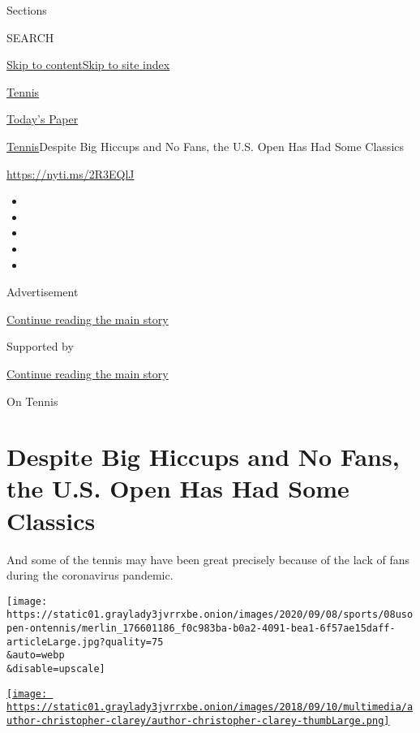 Sections

SEARCH

\protect\hyperlink{site-content}{Skip to
content}\protect\hyperlink{site-index}{Skip to site index}

\href{https://www.nytimes3xbfgragh.onion/section/sports/tennis}{Tennis}

\href{https://myaccount.nytimes3xbfgragh.onion/auth/login?response_type=cookie\&client_id=vi}{}

\href{https://www.nytimes3xbfgragh.onion/section/todayspaper}{Today's
Paper}

\href{/section/sports/tennis}{Tennis}\textbar{}Despite Big Hiccups and
No Fans, the U.S. Open Has Had Some Classics

\url{https://nyti.ms/2R3EQlJ}

\begin{itemize}
\item
\item
\item
\item
\item
\end{itemize}

Advertisement

\protect\hyperlink{after-top}{Continue reading the main story}

Supported by

\protect\hyperlink{after-sponsor}{Continue reading the main story}

On Tennis

\hypertarget{despite-big-hiccups-and-no-fans-the-us-open-has-had-some-classics}{%
\section{Despite Big Hiccups and No Fans, the U.S. Open Has Had Some
Classics}\label{despite-big-hiccups-and-no-fans-the-us-open-has-had-some-classics}}

And some of the tennis may have been great precisely because of the lack
of fans during the coronavirus pandemic.

\texttt{[image: https://static01.graylady3jvrrxbe.onion/images/2020/09/08/sports/08usopen-ontennis/merlin\_176601186\_f0c983ba-b0a2-4091-bea1-6f57ae15daff-articleLarge.jpg?quality=75\\\&auto=webp\\\&disable=upscale]}

\href{https://www.nytimes3xbfgragh.onion/by/christopher-clarey}{\texttt{[image: https://static01.graylady3jvrrxbe.onion/images/2018/09/10/multimedia/author-christopher-clarey/author-christopher-clarey-thumbLarge.png]}}

